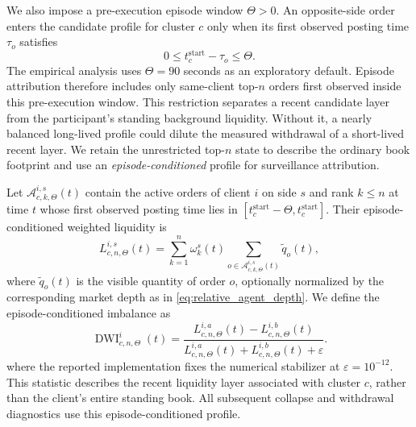 \documentclass[11pt]{article}
\begin{document}
We also impose a pre-execution episode window $\Theta>0$. An opposite-side order enters the candidate profile for cluster
$c$ only when its first observed posting time $\tau_o$ satisfies
\begin{equation}
    0 \leq t_c^{\mathrm{start}}-\tau_o \leq \Theta .
    \label{eq:deceptive_age_window}
\end{equation}
The empirical analysis uses $\Theta=90$ seconds as an exploratory default. Episode attribution therefore includes only
same-client top-$n$ orders first observed inside this pre-execution window. This restriction separates a recent candidate
layer from the participant's standing background liquidity. Without it, a nearly balanced long-lived profile could dilute
the measured withdrawal of a short-lived recent layer. We retain the unrestricted top-$n$ state to describe the
ordinary book footprint and use an \textit{episode-conditioned} profile for surveillance attribution.

Let $\mathcal{A}^{i,s}_{c,k,\Theta}(t)$ contain the active orders of client $i$ on side $s$ and rank $k\leq n$ at time
$t$ whose first observed posting time lies in
$[t_c^{\mathrm{start}}-\Theta,t_c^{\mathrm{start}}]$. Their episode-conditioned weighted liquidity is
\begin{equation}
    L^{i,s}_{c,n,\Theta}(t)
    =
    \sum_{k=1}^{n}
    \omega^{s}_{k}(t)
    \sum_{o\in\mathcal{A}^{i,s}_{c,k,\Theta}(t)}
    \widetilde q_o(t),
    \label{eq:episode_conditioned_liquidity}
\end{equation}
where $\widetilde q_o(t)$ is the visible quantity of order $o$, optionally normalized by the corresponding market depth as
in \cref{eq:relative_agent_depth}. We define the episode-conditioned imbalance as
\begin{equation}
    \operatorname{DWI}^{i}_{c,n,\Theta}(t)
    =
    \frac{
        L^{i,a}_{c,n,\Theta}(t)-L^{i,b}_{c,n,\Theta}(t)
    }{
        L^{i,a}_{c,n,\Theta}(t)+L^{i,b}_{c,n,\Theta}(t)+\varepsilon
    }.
    \label{eq:episode_conditioned_dwi}
\end{equation}
where the reported implementation fixes the numerical stabilizer at $\varepsilon=10^{-12}$. This statistic describes the
recent liquidity layer associated with cluster $c$, rather than the client's entire standing book. All subsequent collapse
and withdrawal diagnostics use this episode-conditioned profile.
\end{document}
